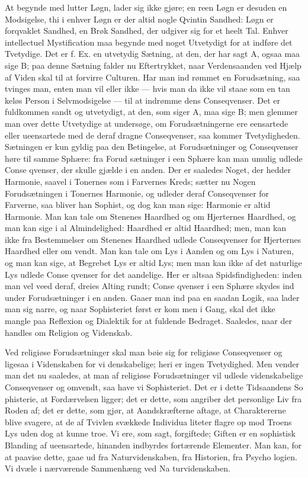 \documentclass[12pt]{book}
\newcommand{\opage}[1]{\marginnote{\footnotesize\textit{[#1]}}}
\begin{document}
At begynde med lutter Løgn, lader sig ikke
gjøre; en reen Løgn er desuden en Modsigelse, thi i
enhver Løgn er der altid nogle Qvintin Sandhed: Løgn
er forqvaklet Sandhed, en Brøk Sandhed, der udgiver
sig for et heelt Tal. Enhver intellectuel Mystification
maa begynde med noget Utvetydigt for at indføre det
Tvetydige. Det er f. Ex. en utvetydig Sætning, at den,
der har sagt A, ogsaa maa sige B; paa denne Sætning
falder nu Eftertrykket, naar Verdensaanden ved Hjælp
af Viden skal til at forvirre Culturen. Har man ind\-%
rømmet en Forudsætning, saa tvinges man, enten man
vil eller ikke --- hvis man da ikke vil staae som en tan\-%
keløs Person i Selvmodsigelse --- til at indrømme dens
Conseqvenser. Det er fuldkommen sandt og utvetydigt,
at den, som siger A, maa sige B; men glemmer man
over dette Utvetydige at undersøge, om Forudsætningerne
ere eensartede eller ueensartede med de deraf dragne
Conseqvenser, saa kommer Tvetydigheden. Sætningen
er kun gyldig paa den Betingelse, at Forudsætninger
\opage{59}\setcounter{footnote}{0}%
og Conseqvenser høre til samme Sphære: fra Forud\-%
sætninger i een Sphære kan man umulig udlede Conse\-%
qvenser, der skulle gjælde i en anden. Der er saaledes
Noget, der hedder Harmonie, saavel i Tonernes som i
Farvernes Kreds; sætter nu Nogen Forudsætningen i
Tonernes Harmonie, og udleder deraf Conseqvenser for
Farverne, saa bliver han Sophist, og dog kan man sige:
Harmonie er altid Harmonie. Man kan tale om Stenenes
Haardhed og om Hjerternes Haardhed, og man kan sige
i al Almindelighed: Haardhed er altid Haardhed; men,
man kan ikke fra Bestemmelser om Stenenes Haardhed
udlede Conseqvenser for Hjerternes Haardhed eller om\-%
vendt. Man kan tale om Lys i Aanden og om Lys i
Naturen, og man kan sige, at Begrebet Lys er altid Lys;
men man kan ikke af det naturlige Lys udlede Conse\-%
qvenser for det aandelige. Her er altsaa Spidsfindigheden:
inden man vel veed deraf, dreies Alting rundt; Conse\-%
qvenser i een Sphære skydes ind under Forudsætninger
i en anden. Gaaer man ind paa en saadan Logik, saa
lader man sig narre, og naar Sophisteriet først er kom\-%
men i Gang, skal det ikke mangle paa Reflexion og
Dialektik for at fuldende Bedraget. Saaledes, naar der
handles om Religion og Videnskab.

Ved religiøse Forudsætninger skal man bøie sig for
religiøse Conseqvenser og ligesaa i Videnskaben for vi\-%
denskabelige; heri er ingen Tvetydighed. Men vender
man det nu saaledes, at man af religiøse Forudsætninger
vil udlede videnskabelige Conseqvenser og omvendt, saa
have vi Sophisteriet. Det er i dette Tidsaandens So\-%
phisterie, at Fordærvelsen ligger; det er dette, som
angriber det personlige Liv fra Roden af; det er dette,
som gjør, at Aandskræfterne aftage, at Charaktererne
blive svagere, at de af Tvivlen svækkede Individua\-%
liteter flagre op mod Troens Lys uden dog at kunne
\opage{60}\setcounter{footnote}{0}%
troe. Vi ere, som sagt, forgiftede; Giften er en sophistisk
Blanding af ueensartede, hinanden indbyrdes fortærende
Elementer. Man kan, for at paavise dette, gaae
ud fra Naturvidenskaben, fra Historien, fra Psycho\-%
logien. Vi dvæle i nærværende Sammenhæng ved Na\-%
turvidenskaben.
\end{document}
